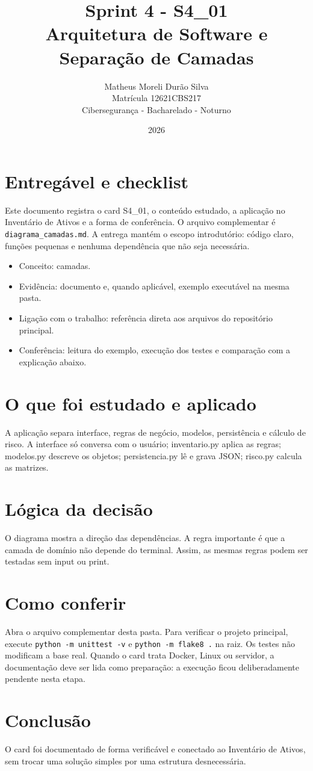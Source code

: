 \documentclass[12pt]{article}
\title{Sprint 4 - S4\_01\\Arquitetura de Software e Separação de Camadas}
\author{Matheus Moreli Durão Silva\\ Matrícula 12621CBS217\\ Cibersegurança - Bacharelado - Noturno}
\date{2026}
\begin{document}
\maketitle

\section*{Entregável e checklist}
Este documento registra o card S4\_01, o conteúdo estudado, a aplicação no Inventário de Ativos e a forma de conferência. O arquivo complementar é \texttt{diagrama\_camadas.md}. A entrega mantém o escopo introdutório: código claro, funções pequenas e nenhuma dependência que não seja necessária.

\begin{itemize}
\item Conceito: camadas.
\item Evidência: documento e, quando aplicável, exemplo executável na mesma pasta.
\item Ligação com o trabalho: referência direta aos arquivos do repositório principal.
\item Conferência: leitura do exemplo, execução dos testes e comparação com a explicação abaixo.
\end{itemize}

\section*{O que foi estudado e aplicado}
A aplicação separa interface, regras de negócio, modelos, persistência e cálculo de risco. A interface só conversa com o usuário; inventario.py aplica as regras; modelos.py descreve os objetos; persistencia.py lê e grava JSON; risco.py calcula as matrizes.

\section*{Lógica da decisão}
O diagrama mostra a direção das dependências. A regra importante é que a camada de domínio não depende do terminal. Assim, as mesmas regras podem ser testadas sem input ou print.

\section*{Como conferir}
Abra o arquivo complementar desta pasta. Para verificar o projeto principal, execute \texttt{python -m unittest -v} e \texttt{python -m flake8 .} na raiz. Os testes não modificam a base real. Quando o card trata Docker, Linux ou servidor, a documentação deve ser lida como preparação: a execução ficou deliberadamente pendente nesta etapa.

\section*{Conclusão}
O card foi documentado de forma verificável e conectado ao Inventário de Ativos, sem trocar uma solução simples por uma estrutura desnecessária.
\end{document}

